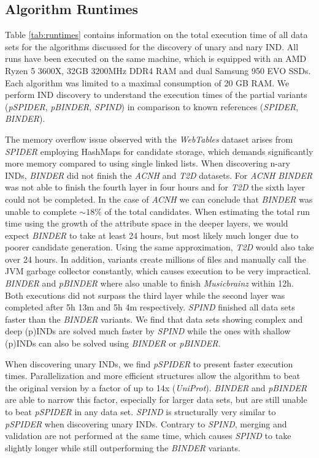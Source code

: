 

\subsection{Algorithm Runtimes} \label{subsec:runtime}
Table \ref{tab:runtimes} contains information on the total execution time of all data sets for the algorithms discussed for the discovery of unary and nary IND. All runs have been executed on the same machine, which is equipped with an AMD Ryzen 5 3600X, 32GB 3200MHz DDR4 RAM and dual Samsung 950 EVO SSDs. Each algorithm was limited to a maximal consumption of 20 GB RAM. We perform IND discovery to understand the execution times of the partial variants (\textit{pSPIDER}, \textit{pBINDER}, \textit{SPIND}) in comparison to known references (\textit{SPIDER}, \textit{BINDER}).

The memory overflow issue observed with the \textit{WebTables} dataset arises from \textit{SPIDER} employing HashMaps for candidate storage, which demands significantly more memory compared to using single linked lists. When discovering n-ary INDs, \textit{BINDER} did not finish the \textit{ACNH} and \textit{T2D} datasets. For \textit{ACNH} \textit{BINDER} was not able to finish the fourth layer in four hours and for \textit{T2D} the sixth layer could not be completed. In the case of \textit{ACNH} we can conclude that \textit{BINDER} was unable to complete $\sim18\%$ of the total candidates. When estimating the total run time using the growth of the attribute space in the deeper layers, we would expect \textit{BINDER} to take at least 24 hours, but most likely much longer due to poorer candidate generation. Using the same approximation, \textit{T2D} would also take over 24 hours. In addition, variants create millions of files and manually call the JVM garbage collector constantly, which causes execution to be very impractical. \textit{BINDER} and \textit{pBINDER} where also unable to finish \textit{Musicbrainz} within 12h. Both executions did not surpass the third layer while the second layer was completed after 5h 13m and 5h 4m respectively. \textit{SPIND} finished all data sets faster than the \textit{BINDER} variants. We find that data sets showing complex and deep (p)INDs are solved much faster by \textit{SPIND} while the ones with shallow (p)INDs can also be solved using \textit{BINDER} or \textit{pBINDER}.

When discovering unary INDs, we find \textit{pSPIDER} to present faster execution times. Parallelization and more efficient structures allow the algorithm to beat the original version by a factor of up to 14x (\textit{UniProt}). \textit{BINDER} and \textit{pBINDER} are able to narrow this factor, especially for larger data sets, but are still unable to beat \textit{pSPIDER} in any data set. \textit{SPIND} is structurally very similar to \textit{pSPIDER} when discovering unary INDs. Contrary to \textit{SPIND}, merging and validation are not performed at the same time, which causes \textit{SPIND} to take slightly longer while still outperforming the \textit{BINDER} variants.


